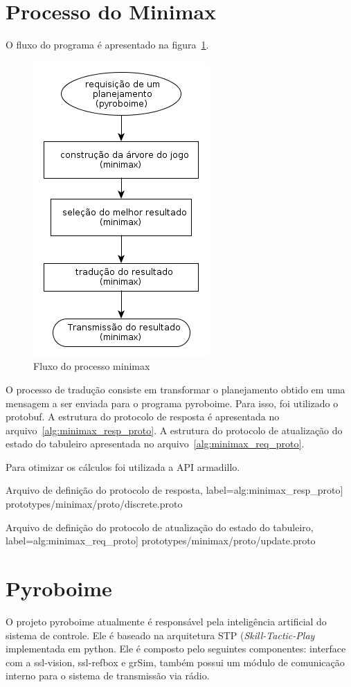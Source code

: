 \section{Processo do Minimax}\label{sec:minimax}

O fluxo do programa é apresentado na figura~\ref{fig:minimax_flow}.

\begin{figure}
  \centering
  \includegraphics[width=0.2 \linewidth]{img/minimax_flow}
  \caption{Fluxo do processo minimax}\label{fig:minimax_flow}
\end{figure}

O processo de tradução consiste em transformar o planejamento obtido em uma
mensagem a ser enviada para o programa pyroboime. Para isso, foi utilizado
o protobuf. A estrutura do protocolo de resposta é apresentada no
arquivo~\ref{alg:minimax_resp_proto}. A estrutura do protocolo de atualização do
estado do tabuleiro apresentada no arquivo~\ref{alg:minimax_req_proto}.

Para otimizar os cálculos foi utilizada a API armadillo.

{Arquivo de definição do protocolo de resposta},
label={alg:minimax_resp_proto}] {prototypes/minimax/proto/discrete.proto}

{Arquivo de definição do protocolo de atualização do
  estado do tabuleiro},
label={alg:minimax_req_proto}] {prototypes/minimax/proto/update.proto}

\section{Pyroboime}\label{sec:pyroboime}

O projeto pyroboime atualmente é responsável pela inteligência artificial do
sistema de controle. Ele é baseado na arquitetura STP (\textit{Skill-Tactic-Play}
implementada em python.
Ele é composto pelo seguintes componentes: interface com a ssl-vision,
ssl-refbox e grSim, também possui um módulo de comunicação interno para o
sistema de transmissão via rádio.

